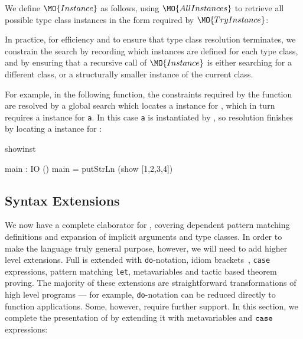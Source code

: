 
We define $\MO{Instance}$ as follows, using $\MO{AllInstances}$ to retrieve
all possible type class instances in the form required by $\MO{TryInstance}$:


In practice, for efficiency and to ensure that type class resolution terminates,
we constrain the search by recording which instances are defined for each type class,
and by ensuring that a recursive call of $\MO{Instance}$ is either searching for
a different class, or a structurally smaller instance of the current class. 

For example, in the following function, the constraints required by the
 function are resolved by a global search which locates a 
instance for , which in turn requires a  instance for
\texttt{a}.  In this case \texttt{a} is instantiated by , so resolution finishes
by locating a  instance for :

\begin{SaveVerbatim}{showinst}

main : IO ()
main = putStrLn (show [1,2,3,4]) 

\end{SaveVerbatim}

\subsection{Syntax Extensions}

We now have a complete elaborator for \IdrisM{}, covering 
dependent pattern matching definitions and expansion of implicit arguments
and type classes. In order to make the language truly general purpose, however, we
will need to add higher level extensions. Full \Idris{} is \IdrisM{} extended
with \texttt{do}-notation, idiom brackets~\cite{McBride2007}, \texttt{case} expressions,
pattern matching \texttt{let}, metavariables and tactic based theorem proving.
The majority of these extensions are straightforward transformations of high level
\Idris{} programs --- for example, \texttt{do}-notation can be reduced directly to
\IdrisM{} function applications. Some, however, require further support. In this section,
we complete the presentation of \IdrisM{} by extending it with metavariables
and $\mathtt{case}$ expressions:

